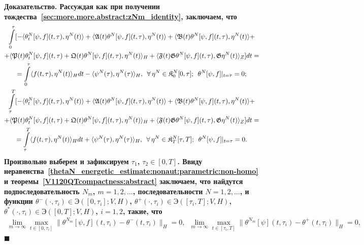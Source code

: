 \documentclass{report}
\newenvironment{Proof}{\par\noindent\bf Доказательство.\rm}{ $\blacksquare$\par}
\begin{document}
\begin{Proof}
Рассуждая как при получении тождества~\eqref{sec:more.more.abstract:zNm_identity}, заключаем, что
\begin{gather}
\label{thetaN_identity1:nonaut:parametric:non-homo}
\int\limits_0^\tau[-\langle\theta^{N}_t[\psi,f](t,\tau),{\eta}^{N}(t)\rangle+\langle\mathfrak{A}(t)\theta^{N}[\psi,f](t,\tau),\eta^{N}(t)\rangle+
\langle\mathfrak{B}(t)\theta^{N}[\psi,f](t,\tau),\eta^{N}(t)\rangle+\\
\notag+\langle\mathfrak{P}(t)\theta^{N}_t[\psi,f](t,\tau)+\mathfrak{Q}(t)\theta^{N}[\psi,f](t,\tau),\eta^N(t)\rangle_H+\langle\mathfrak{F}(t) \mathfrak{G}\theta^{N}[\psi,f](t,\tau), \mathfrak{G}\eta^{N}(t)\rangle_Z]dt=\\
\notag=\int\limits_0^\tau\langle f(t,\tau),\eta^N(t)\rangle_Hdt-\langle\psi^{N}(\tau),\eta^{N}(\tau)\rangle_H,\,\,\,\forall\,\eta^N\in\mathfrak{K}^N_{0}[0,\tau];\,\,\,
\theta^{N}[\psi,f]|_{t=\tau}=0;\\
\label{thetaN_identity2:nonaut:parametric:non-homo}
\int\limits_\tau^T[-\langle\theta^{N}_t[\psi,f](t,\tau),{\eta}^{N}(t)\rangle+\langle\mathfrak{A}(t)\theta^{N}[\psi,f](t,\tau),\eta^{N}(t)\rangle+
\langle\mathfrak{B}(t)\theta^{N}[\psi,f](t,\tau),\eta^{N}(t)\rangle+\\
\notag+\langle\mathfrak{P}(t)\theta^{N}_t[\psi,f](t,\tau)+\mathfrak{Q}(t)\theta^{N}[\psi,f](t,\tau),\eta^N(t)\rangle_H+\langle\mathfrak{F}(t) \mathfrak{G}\theta^{N}[\psi,f](t,\tau), \mathfrak{G}\eta^{N}(t)\rangle_Z]dt=\\
\notag=\int\limits_\tau^T\langle f(t,\tau),\eta^N(t)\rangle_Hdt+\langle\psi^{N}(\tau),\eta^{N}(\tau)\rangle_H,\,\,\,\forall\,\eta^N\in\mathfrak{K}^N_{T}[\tau,T];\,\,\,
\theta^{N}[\psi,f]|_{t=\tau}=0.
\end{gather}
Произвольно выберем и зафиксируем $\tau_1$, $\tau_2\in[0,T]$. Ввиду неравенства~\eqref{thetaN_energetic_estimate:nonaut:parametric:non-homo} и  теоремы~\ref{V1120QTcompactness:abstract} заключаем, что найдутся подпоследовательность ${N_m}$, $m=1,2,\dots$, последовательности $N=1,2,\dots$, и функции $\theta^-(\cdot,\tau_i)\in \textrm{Э}([0,\tau_i];V,H)$, $\theta^+(\cdot,\tau_i)\in \textrm{Э}([\tau_i,T];V,H)$,  $\theta^*(\cdot,\tau_i)\in \textrm{Э}([0,T];V,H)$, $i=1,2$, такие, что
\begin{gather}
\label{thetaN_convergence:nonaut:parametric:non-homo}
\lim\limits_{m\to\infty}\max\limits_{t\in[0,\tau_i]}\|\theta^{N_m}[\psi,f](t,\tau_i)-\theta^-(t,\tau_i)\|_{H}=0,\,\,\,
\lim\limits_{m\to\infty}\max\limits_{t\in[\tau_i,T]}\|\theta^{N_m}[\psi](t,\tau_i)-\theta^+(t,\tau_i)\|_{H}=0, \\

\end{gather}
\end{Proof}
\end{document}
